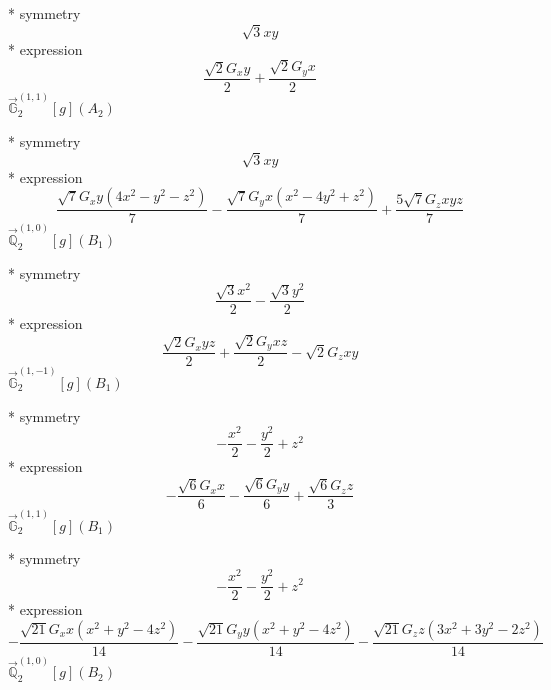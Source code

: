 \documentclass[fleqn,8pt]{jsarticle}
\begin{document}
\noindent\quad ** symmetry
\begin{dmath*}
\sqrt{3} x y
\end{dmath*}
\noindent\quad ** expression
\begin{dmath*}
\frac{\sqrt{2} G_{x} y}{2} + \frac{\sqrt{2} G_{y} x}{2}
\end{dmath*}
\noindent\quad $\vec{\mathbb{G}}_{2}^{(1,1)}[g](A_{2})$

\noindent\quad ** symmetry
\begin{dmath*}
\sqrt{3} x y
\end{dmath*}
\noindent\quad ** expression
\begin{dmath*}
\frac{\sqrt{7} G_{x} y \left(4 x^{2} - y^{2} - z^{2}\right)}{7} - \frac{\sqrt{7} G_{y} x \left(x^{2} - 4 y^{2} + z^{2}\right)}{7} + \frac{5 \sqrt{7} G_{z} x y z}{7}
\end{dmath*}
\noindent\quad $\vec{\mathbb{Q}}_{2}^{(1,0)}[g](B_{1})$

\noindent\quad ** symmetry
\begin{dmath*}
\frac{\sqrt{3} x^{2}}{2} - \frac{\sqrt{3} y^{2}}{2}
\end{dmath*}
\noindent\quad ** expression
\begin{dmath*}
\frac{\sqrt{2} G_{x} y z}{2} + \frac{\sqrt{2} G_{y} x z}{2} - \sqrt{2} G_{z} x y
\end{dmath*}
\noindent\quad $\vec{\mathbb{G}}_{2}^{(1,-1)}[g](B_{1})$

\noindent\quad ** symmetry
\begin{dmath*}
- \frac{x^{2}}{2} - \frac{y^{2}}{2} + z^{2}
\end{dmath*}
\noindent\quad ** expression
\begin{dmath*}
- \frac{\sqrt{6} G_{x} x}{6} - \frac{\sqrt{6} G_{y} y}{6} + \frac{\sqrt{6} G_{z} z}{3}
\end{dmath*}
\noindent\quad $\vec{\mathbb{G}}_{2}^{(1,1)}[g](B_{1})$

\noindent\quad ** symmetry
\begin{dmath*}
- \frac{x^{2}}{2} - \frac{y^{2}}{2} + z^{2}
\end{dmath*}
\noindent\quad ** expression
\begin{dmath*}
- \frac{\sqrt{21} G_{x} x \left(x^{2} + y^{2} - 4 z^{2}\right)}{14} - \frac{\sqrt{21} G_{y} y \left(x^{2} + y^{2} - 4 z^{2}\right)}{14} - \frac{\sqrt{21} G_{z} z \left(3 x^{2} + 3 y^{2} - 2 z^{2}\right)}{14}
\end{dmath*}
\noindent\quad $\vec{\mathbb{Q}}_{2}^{(1,0)}[g](B_{2})$
\end{document}
